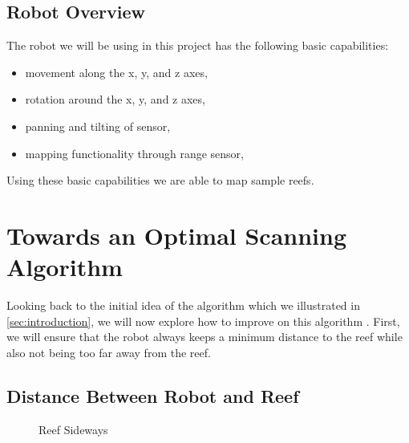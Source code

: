 \documentclass[twoside, 12pt]{article}
\begin{document}
\subsection{Robot Overview}

The robot we will be using in this project has the following basic capabilities:
\begin{itemize}
\item movement along the x, y, and z axes,
\item rotation around the x, y, and z axes,
\item panning and tilting of sensor,
\item mapping functionality through range sensor,
\end{itemize}

Using these basic capabilities we are able to map sample reefs.

\newpage
\section{Towards an Optimal Scanning Algorithm}
\label{sec:optimalScanningAlgorithm}

Looking back to the initial idea of the algorithm which we illustrated in \autoref{sec:introduction}, we will now explore how to improve on this algorithm \cite{CoastLineExplorer:npentrel15}. First, we will ensure that the robot always keeps a minimum distance to the reef while also not being too far away from the reef.\\

\subsection{Distance Between Robot and Reef}
\label{sec:distanceBetweenRobotAndReef}
\begin{figure}
\vspace{-28pt}
  \begin{center}
  \end{center}
\vspace{-20pt}
  \caption{Reef Sideways}
  \label{fig:reef}
\vspace{20pt}
\end{figure}
\end{document}
